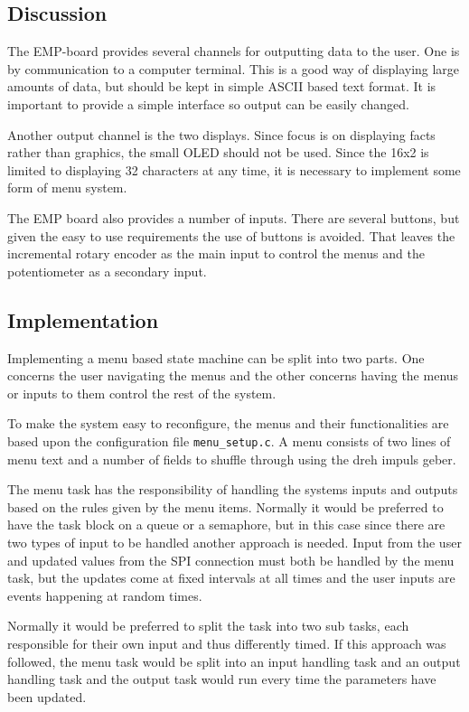 \subsection{Discussion}
The EMP-board provides several channels for outputting data to the user. One is
by communication to a computer terminal. This is a good way of displaying large
amounts of data, but should be kept in simple ASCII based text format. It is
important to provide a simple interface so output can be easily changed.

Another output channel is the two displays. Since focus is on displaying facts
rather than graphics, the small OLED should not be used. Since the 16x2
is limited to displaying 32 characters at any time, it is necessary to implement
some form of menu system.
 
The EMP board also provides a number of inputs. There are several buttons, but
given the easy to use requirements the use of buttons is avoided. That leaves
the incremental rotary encoder as the main input to control the menus and the potentiometer as a
secondary input.



\subsection{Implementation}
Implementing a menu based state machine can be split into two parts. One
concerns the user navigating the menus and the other concerns having the menus or inputs to them
control the rest of the system. 

To make the system easy to reconfigure, the menus and their functionalities are based upon the configuration file \texttt{menu\_setup.c}. A menu consists of two lines of menu text and a number of fields to shuffle through using the dreh impuls geber. 

The menu task has the responsibility of handling the systems inputs and outputs based on the rules given by the menu items. Normally it would be preferred to have the task block on a queue or a semaphore, but in this case since there are two types of input to be handled another approach is needed.  Input from the user and updated values from the SPI connection must both be handled by the menu task, but the updates come at fixed intervals at all times and the user inputs are events happening at random times.

Normally it would be preferred to split the task into two sub tasks, each responsible for their own input and thus differently timed. If this approach was followed, the menu task would be split into an input handling task and an output handling task and the output task would run every time the parameters have been updated. 

